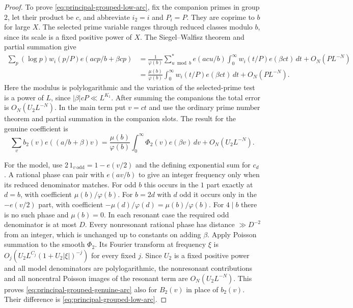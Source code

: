 \documentclass[11pt,a4paper]{article}
\theoremstyle{paperplain}
\numberwithin{equation}{section}
\begin{document}
\begin{proof}
To prove \eqref{eq:principal-grouped-low-arc}, fix the companion
primes in group $2$, let their product be $c$, and abbreviate
$i_2=i$ and $P_i=P$. They are coprime to $b$ for large $X$.
The selected prime variable ranges through reduced classes modulo
$b$, since its scale is a fixed positive power of $X$. The
Siegel--Walfisz theorem and partial summation give
\begin{align*}
 \sum_p(\log p)w_i(p/P)e(acp/b+\beta cp)
 &=\frac1{\varphi(b)}\sum_{u\bmod b}^{*} e(acu/b)
               \int_0^\infty w_i(t/P)e(\beta ct)\,dt
       +O_N(PL^{-N})\\
 &=\frac{\mu(b)}{\varphi(b)}\int_0^\infty
                       w_i(t/P)e(\beta ct)\,dt+O_N(PL^{-N}).
\end{align*}
Here the modulus is polylogarithmic and the variation of the
selected-prime test is a power of $L$, since $|\beta|cP\ll
L^{K_1}$. After summing the companions the total error is
$O_N(U_2L^{-N})$. In the main term put $v=ct$ and use the
ordinary prime number theorem and partial summation in the
companion slots. The result for the genuine coefficient is
\begin{equation}\label{eq:principal-grouped-genuine-arc}
 \sum_v b_2(v)e((a/b+\beta)v)
     =\frac{\mu(b)}{\varphi(b)}\int_0^\infty
                         \Phi_2(v)e(\beta v)\,dv+O_N(U_2L^{-N}).
\end{equation}

For the model, use $2\,1_{v\ \mathrm{odd}}=1-e(v/2)$ and the
defining exponential sum for $c_d$. A rational phase can pair
with $e(av/b)$ to give an integer frequency only when its
reduced denominator matches. For odd $b$ this occurs in the
$1$ part exactly at $d=b$, with coefficient $\mu(b)/\varphi(b)$.
For $b=2d$ with $d$ odd it occurs only in the $-e(v/2)$ part,
with coefficient $-\mu(d)/\varphi(d)=\mu(b)/\varphi(b)$.
For $4\mid b$ there is no such phase and $\mu(b)=0$. In each
resonant case the required odd denominator is at most $D$.
Every nonresonant rational phase has distance $\gg D^{-2}$
from an integer, which is unchanged up to constants on adding
$\beta$. Apply Poisson summation to the smooth $\Phi_2$. Its
Fourier transform at frequency $\xi$ is
$O_j(U_2L^{C_j}(1+U_2|\xi|)^{-j})$ for every fixed $j$.
Since $U_2$ is a fixed positive power and all model denominators
are polylogarithmic, the nonresonant contributions and all
noncentral Poisson images of the resonant term are $O_N(U_2L^{-N})$.
This proves \eqref{eq:principal-grouped-genuine-arc} also for
$B_2(v)$ in place of $b_2(v)$. Their difference is
\eqref{eq:principal-grouped-low-arc}.
\end{proof}
\end{document}
